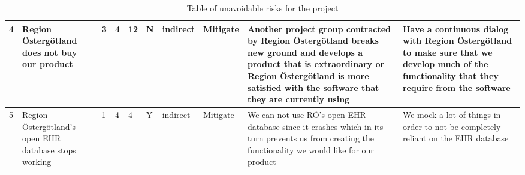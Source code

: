 \begin{table}[h!]
\begin{center}
\begin{tabular}{ | m{0.3cm} |m{2.8cm} |m{0.65cm} |m{0.6cm} |m{0.6cm} |m{0.6cm} |m{0.7cm} |m{0.6cm} |m{2.8cm} |m{2.8cm} | }
\hline


4 & Region Östergötland does not buy our product & 3 & 4 & \cellcolor{red!40}12 & N & indirect & Mitigate & Another project group contracted by Region Östergötland breaks new ground and develops a product that is extraordinary or Region Östergötland is more satisfied with the software that they are currently using & Have a continuous dialog with Region Östergötland to make sure that we develop much of the functionality that they require from the software\\
\hline
5 & Region Östergötland's open EHR database stops working & 1 & 4 & \cellcolor{green!40}4 & Y & indirect &  Mitigate & We can not use RÖ's open EHR database since it crashes which in its turn prevents us from creating the functionality we would like for our product & We mock a lot of things in order to not be completely reliant on the EHR database \\
\hline


\end{tabular}

\end{center}
\caption{\label{tab:table-name}Table of unavoidable risks for the project}

\end{table}

